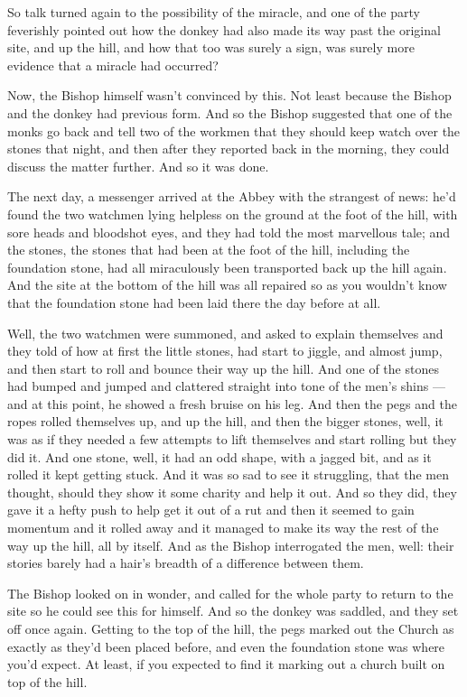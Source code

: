 \documentclass[
  12pt,
  a5paper,
  twoside]{book}
\begin{document}
So talk turned again to the possibility of the miracle, and one of the
party feverishly pointed out how the donkey had also made its way past
the original site, and up the hill, and how that too was surely a sign,
was surely more evidence that a miracle had occurred?

Now, the Bishop himself wasn't convinced by this. Not least because the
Bishop and the donkey had previous form. And so the Bishop suggested
that one of the monks go back and tell two of the workmen that they
should keep watch over the stones that night, and then after they
reported back in the morning, they could discuss the matter further. And
so it was done.

The next day, a messenger arrived at the Abbey with the strangest of
news: he'd found the two watchmen lying helpless on the ground at the
foot of the hill, with sore heads and bloodshot eyes, and they had told
the most marvellous tale; and the stones, the stones that had been at
the foot of the hill, including the foundation stone, had all
miraculously been transported back up the hill again. And the site at
the bottom of the hill was all repaired so as you wouldn't know that the
foundation stone had been laid there the day before at all.

Well, the two watchmen were summoned, and asked to explain themselves
and they told of how at first the little stones, had start to jiggle,
and almost jump, and then start to roll and bounce their way up the
hill. And one of the stones had bumped and jumped and clattered straight
into tone of the men's shins --- and at this point, he showed a fresh
bruise on his leg. And then the pegs and the ropes rolled themselves up,
and up the hill, and then the bigger stones, well, it was as if they
needed a few attempts to lift themselves and start rolling but they did
it. And one stone, well, it had an odd shape, with a jagged bit, and as
it rolled it kept getting stuck. And it was so sad to see it struggling,
that the men thought, should they show it some charity and help it out.
And so they did, they gave it a hefty push to help get it out of a rut
and then it seemed to gain momentum and it rolled away and it managed to
make its way the rest of the way up the hill, all by itself. And as the
Bishop interrogated the men, well: their stories barely had a hair's
breadth of a difference between them.

The Bishop looked on in wonder, and called for the whole party to return
to the site so he could see this for himself. And so the donkey was
saddled, and they set off once again. Getting to the top of the hill,
the pegs marked out the Church as exactly as they'd been placed before,
and even the foundation stone was where you'd expect. At least, if you
expected to find it marking out a church built on top of the hill.
\end{document}
